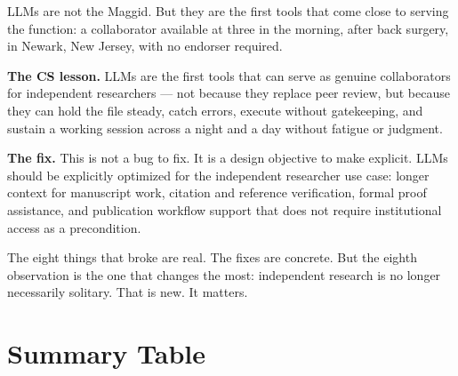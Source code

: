 \documentclass[19pt]{book}
\theoremstyle{plain}
\theoremstyle{definition}
\theoremstyle{remark}
\begin{document}
LLMs are not the Maggid. But they are the first tools that
come close to serving the function: a collaborator available
at three in the morning, after back surgery, in Newark,
New Jersey, with no endorser required.

\textbf{The CS lesson.} LLMs are the first tools that can serve
as genuine collaborators for independent researchers --- not
because they replace peer review, but because they can hold the
file steady, catch errors, execute without gatekeeping, and
sustain a working session across a night and a day without
fatigue or judgment.

\textbf{The fix.} This is not a bug to fix. It is a design
objective to make explicit. LLMs should be explicitly optimized
for the independent researcher use case: longer context for
manuscript work, citation and reference verification, formal
proof assistance, and publication workflow support that does
not require institutional access as a precondition.

The eight things that broke are real. The fixes are concrete.
But the eighth observation is the one that changes the most:
independent research is no longer necessarily solitary.
That is new. It matters.

\section{Summary Table}
\label{sec:summary}
\end{document}

